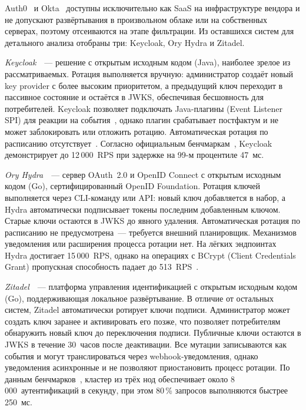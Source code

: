 Auth0~\cite{Auth0KeyRotation} и Okta~\cite{OktaKeyRotation}
доступны исключительно как SaaS на инфраструктуре вендора
и не допускают развёртывания в произвольном облаке или на собственных серверах,
поэтому отсеиваются на этапе фильтрации.
Из оставшихся систем для детального анализа отобраны три:
Keycloak, Ory Hydra и Zitadel.

\emph{Keycloak}~\cite{KeycloakKeys}~--- решение с открытым исходным кодом (Java),
наиболее зрелое из рассматриваемых.
Ротация выполняется вручную:
администратор создаёт новый key provider с более высоким приоритетом,
а предыдущий ключ переходит в пассивное состояние и остаётся в JWKS,
обеспечивая бесшовность для потребителей.
Keycloak позволяет подключать Java-плагины (Event Listener SPI)
для реакции на события~\cite{KeycloakSPI},
однако плагин срабатывает постфактум
и не может заблокировать или отложить ротацию.
Автоматическая ротация по расписанию отсутствует~\cite{KeycloakKeys}.
Согласно официальным бенчмаркам~\cite{KeycloakBenchmark},
Keycloak демонстрирует до 12\,000~RPS
при задержке на 99-м процентиле 47~мс.

\emph{Ory Hydra}~\cite{OryHydra}~--- сервер OAuth~2.0 и OpenID Connect
с открытым исходным кодом (Go),
сертифицированный OpenID Foundation.
Ротация ключей выполняется через CLI-команду или API:
новый ключ добавляется в набор,
а Hydra автоматически подписывает токены последним добавленным ключом.
Старые ключи остаются в JWKS до явного удаления.
Автоматическая ротация по расписанию не предусмотрена~---
требуется внешний планировщик.
Механизмов уведомления или расширения процесса ротации нет.
На лёгких эндпоинтах Hydra достигает 15\,000~RPS,
однако на операциях с BCrypt (Client Credentials Grant)
пропускная способность падает до 513~RPS~\cite{OryHydraBenchmark}.

\emph{Zitadel}~\cite{Zitadel}~--- платформа управления идентификацией
с открытым исходным кодом (Go),
поддерживающая локальное развёртывание.
В отличие от остальных систем, Zitadel автоматически ротирует ключи подписи.
Администратор может создать ключ заранее и активировать его позже,
что позволяет потребителям обнаружить новый ключ до переключения подписи.
Публичные ключи остаются в JWKS в течение 30~часов после деактивации.
Все мутации записываются как события и могут транслироваться
через webhook-уведомления,
однако уведомления асинхронные и не позволяют приостановить процесс ротации.
По данным бенчмарков~\cite{ZitadelBenchmark},
кластер из трёх нод обеспечивает около 8\,000~аутентификаций в секунду,
при этом 80\,\% запросов выполняются быстрее 250~мс.

